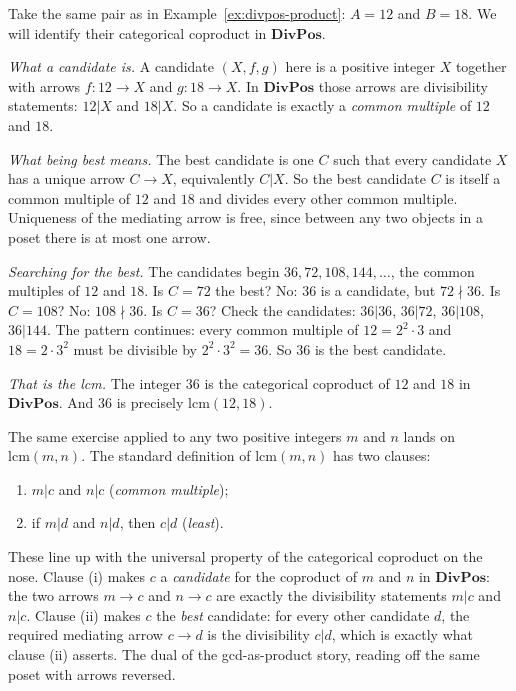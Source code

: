 \begin{example}\label{ex:divpos-coproduct}
Take the same pair as in Example~\ref{ex:divpos-product}:
$A = 12$ and $B = 18$. We will identify their categorical
coproduct in $\mathbf{DivPos}$.

\textit{What a candidate is.} A candidate $(X, f, g)$ here is a
positive integer $X$ together with arrows $f : 12 \to X$ and
$g : 18 \to X$. In $\mathbf{DivPos}$ those arrows are
divisibility statements: $12 | X$ and $18 | X$. So a candidate
is exactly a \textit{common multiple} of $12$ and $18$.

\textit{What being best means.} The best candidate is one $C$
such that every candidate $X$ has a unique arrow $C \to X$,
equivalently $C | X$. So the best candidate $C$ is itself a
common multiple of $12$ and $18$ and divides every other
common multiple. Uniqueness of the mediating arrow is free,
since between any two objects in a poset there is at most one
arrow.

\textit{Searching for the best.} The candidates begin
$36, 72, 108, 144, \ldots$, the common multiples of $12$ and
$18$. Is $C = 72$ the best? No: $36$ is a candidate, but
$72 \nmid 36$. Is $C = 108$? No: $108 \nmid 36$. Is $C = 36$?
Check the candidates: $36 | 36$, $36 | 72$, $36 | 108$,
$36 | 144$. The pattern continues: every common multiple of
$12 = 2^2 \cdot 3$ and $18 = 2 \cdot 3^2$ must be divisible by
$2^2 \cdot 3^2 = 36$. So $36$ is the best candidate.

\textit{That is the lcm.} The integer $36$ is the categorical
coproduct of $12$ and $18$ in $\mathbf{DivPos}$. And $36$ is
precisely $\mathrm{lcm}(12, 18)$.
\end{example}

\noindent The same exercise applied to any two positive
integers $m$ and $n$ lands on $\mathrm{lcm}(m, n)$. The standard
definition of $\mathrm{lcm}(m, n)$ has two clauses:
\begin{enumerate}[label=(\roman*)]
    \item $m | c$ and $n | c$ (\textit{common multiple});
    \item if $m | d$ and $n | d$, then $c | d$ (\textit{least}).
\end{enumerate}
These line up with the universal property of the categorical
coproduct on the nose. Clause (i) makes $c$ a
\textit{candidate} for the coproduct of $m$ and $n$ in
$\mathbf{DivPos}$: the two arrows $m \to c$ and $n \to c$ are
exactly the divisibility statements $m | c$ and $n | c$.
Clause (ii) makes $c$ the \textit{best} candidate: for every
other candidate $d$, the required mediating arrow $c \to d$ is
the divisibility $c | d$, which is exactly what clause (ii)
asserts. The dual of the gcd-as-product story, reading off the
same poset with arrows reversed.

